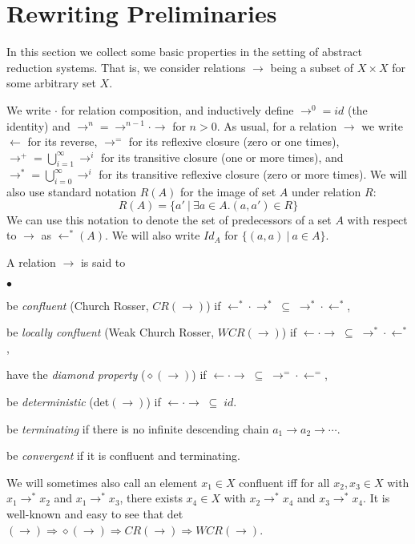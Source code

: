 \documentclass{LMCS}
\newcommand{\subse}{\; \subseteq \;}
\begin{document}
\section{Rewriting Preliminaries}
\label{sec:rewriting-prelim}

In this section we collect some basic properties in the setting of
abstract reduction systems.  That is, we consider relations $\to$
being a subset of $X \times X$ for some arbitrary set $X$.

We write $\cdot$ for relation composition, and inductively define
$\to^0 = id$ (the identity) and $\to^n = \to^{n-1} \cdot \to$ for $n > 0$.
As usual, for a relation $\to$ we write $\leftarrow$ for its reverse,
$\to^=$ for its reflexive closure (zero or one times),
$\to^+ = \bigcup_{i=1}^\infty \to^i$ for its transitive closure
(one or more times), and $\to^* = \bigcup_{i=0}^\infty \to^i$ for its
transitive reflexive closure (zero or more times).  We will also
use standard notation $R(A)$ for the image of set $A$ under relation $R$:
\[
R(A) = \{ a'\ |\ \exists a\in A. (a,a')\in R\}
\]
\noindent We can use this notation to denote the set of predecessors
of a set $A$ with respect to $\to$ as $\leftarrow^*(A)$.  We will also
write $\textit{Id}_A$ for $\{(a,a)\ |\ a\in A\}$.

\vspace{3mm}
\noindent A relation $\to$ is said to
\begin{iteMize}{$\bullet$}
\item be {\em confluent}
(Church Rosser, $CR(\to)$) if $\leftarrow^* \cdot \to^* \subse
\to^* \cdot \leftarrow^*$,
\item be {\em locally confluent}
(Weak Church Rosser, $WCR(\to)$) if $\leftarrow \cdot \to \subse
\to^* \cdot \leftarrow^*$,
\item have the {\em diamond property}
($\diamond(\to)$) if $\leftarrow \cdot \to \subse
\to^= \cdot \leftarrow^=$,
\item be {\em deterministic} (det$(\to)$) if $\leftarrow \cdot \to \subse id$.
\item be {\em terminating} if there is no infinite descending chain $a_1\to a_2 \to \cdots$.
\item be {\em convergent} if it is confluent and terminating.
\end{iteMize}

\noindent We will sometimes also call an element $x_1\in X$ confluent
iff for all $x_2,x_3\in X$ with $x_1\to^* x_2$ and $x_1\to^* x_3$,
there exists $x_4\in X$ with $x_2\to^* x_4$ and $x_3\to^* x_4$.  It is
well-known and easy to see that det$(\to) \Rightarrow \diamond(\to)
\Rightarrow CR(\to) \Rightarrow WCR(\to)$.
\end{document}
